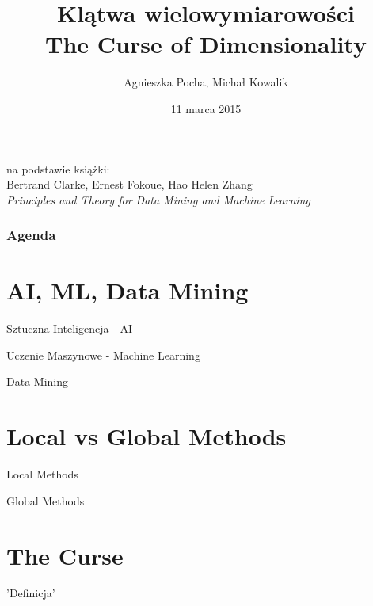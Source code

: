 \documentclass[a4paper]{beamer}
\author{Agnieszka Pocha, Michał Kowalik}
\title{Klątwa wielowymiarowości \\ The Curse of Dimensionality}
\date{11 marca 2015}
\begin{document}
\begin{frame}
\titlepage
{\footnotesize
na podstawie książki: \\
Bertrand Clarke, Ernest Fokoue, Hao Helen Zhang \\
}
\textit{Principles and Theory for Data Mining and Machine Learning}
\end{frame}


\begin{frame}
\frametitle{Agenda}
\tableofcontents
\end{frame}

\section{AI, ML, Data Mining}
\begin{frame}
\begin{block}{Sztuczna Inteligencja - AI}
\end{block}

\begin{block}{Uczenie Maszynowe - Machine Learning}

\end{block}

\begin{block}{Data Mining}

\end{block}
\end{frame}

\section{Local vs Global Methods}
\begin{frame}
\begin{block}{Local Methods}

\end{block}
\begin{block}{Global Methods}

\end{block}
\end{frame}

\section{The Curse}
\begin{frame}
\begin{block}{'Definicja'}

\end{block}
\end{frame}
\end{document}
